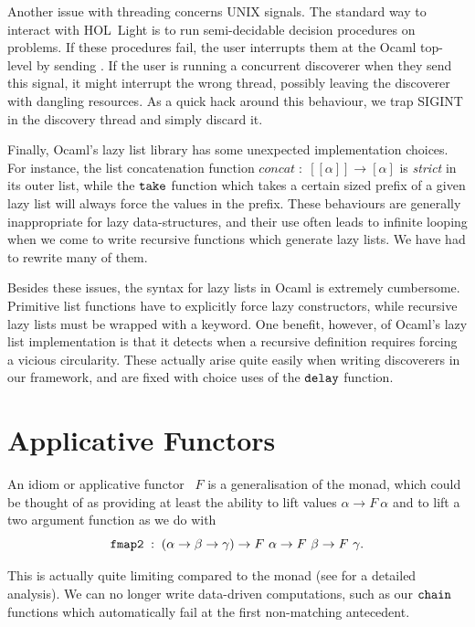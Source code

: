 Another issue with threading concerns UNIX signals. The standard way to interact with HOL~Light is to run semi-decidable decision procedures on problems. If these procedures fail, the user interrupts them at the Ocaml top-level by sending . If the user is running a concurrent discoverer when they send this signal, it might interrupt the wrong thread, possibly leaving the discoverer with dangling resources. As a quick hack around this behaviour, we trap SIGINT in the discovery thread and simply discard it.

Finally, Ocaml's lazy list library has some unexpected implementation choices. For instance, the list concatenation function $concat\;:\;[[\alpha]]\rightarrow[\alpha]$ is \emph{strict} in its outer list, while the $\texttt{take}$ function which takes a certain sized prefix of a given lazy list will always force the values in the prefix. These behaviours are generally inappropriate for lazy data-structures, and their use often leads to infinite looping when we come to write recursive functions which generate lazy lists. We have had to rewrite many of them.

Besides these issues, the syntax for lazy lists in Ocaml is extremely cumbersome. Primitive list functions have to explicitly force lazy constructors, while recursive lazy lists must be wrapped with a  keyword. One benefit, however, of Ocaml's lazy list implementation is that it detects when a recursive definition requires forcing a vicious circularity. These actually arise quite easily when writing discoverers in our framework, and are fixed with choice uses of the $\texttt{delay}$ function.

\section{Applicative Functors}\label{sec:Applicative}
An idiom or applicative functor~\cite{Applicative} $F$ is a generalisation of the monad, which could be thought of as providing at least the ability to lift values $\alpha \rightarrow F\ \alpha$ and to lift a two argument function as we do with 
\begin{displaymath}
\texttt{fmap2}\;:\;(\alpha\rightarrow\beta\rightarrow\gamma)\rightarrow F\ \alpha \rightarrow F\ \beta \rightarrow F\ \gamma.
\end{displaymath}

This is actually quite limiting compared to the monad (see \cite{IdiomsArrowsMonads} for a detailed analysis). We can no longer write data-driven computations, such as our $\texttt{chain}$ functions which automatically fail at the first non-matching antecedent.

